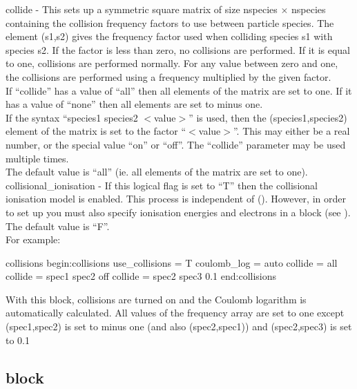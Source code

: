 {\emphtext collide} - This sets up a symmetric square matrix of size
  nspecies$\,\times\,$nspecies containing the collision frequency factors to
  use between particle species. The element (s1,s2) gives the frequency factor
  used when colliding species s1 with species s2.  If the factor is less than
  zero, no collisions are performed.  If it is equal to one, collisions are
  performed normally.  For any value between zero and one, the collisions are
  performed using a frequency multiplied by the given factor.\\
  If ``collide'' has a value of ``all'' then all elements of the matrix are
  set to one. If it has a value of ``none'' then all elements are set to minus
  one.\\
  If the syntax ``species1 species2 $<$value$>$'' is used, then the
  (species1,species2) element of the matrix is set to the factor
  ``$<$value$>$''.  This may either be a real number, or the special value
  ``on'' or ``off''. The ``collide'' parameter may be used multiple times.\\
  The default value is ``all'' (ie. all elements of the matrix are set to
  one).\\

{\emphtext collisional\_ionisation} - If this logical flag is set to ``T''
  then the collisional ionisation model is enabled. This process is independent
  of  (). However, in order to
  set up 
  you must also specify ionisation energies and electrons in a
   block (see ). The default value
  is ``F''.\\

For example:

\begin{lboxverbatim}{collisions}
begin:collisions
   use_collisions = T
   coulomb_log = auto
   collide = all
   collide = spec1 spec2 off
   collide = spec2 spec3 0.1
end:collisions
\end{lboxverbatim}

  With this block, collisions are turned on and the Coulomb logarithm is
  automatically calculated. All values of the frequency array are set
  to one except (spec1,spec2) is set to minus one (and also (spec2,spec1))
  and (spec2,spec3) is set to 0.1


\subsection{\texorpdfstring
  { block}
  {           {qed} block}}
\label{sec:qed_block}

